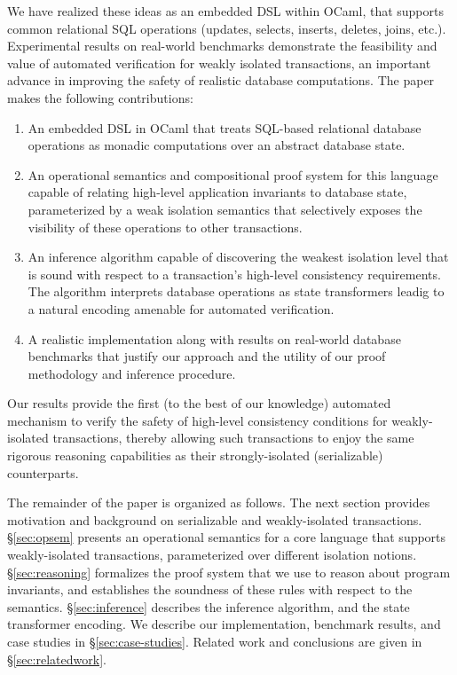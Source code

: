 We have realized these ideas as an embedded DSL within OCaml, that
supports common relational SQL operations (updates, selects, inserts,
deletes, joins, etc.).  Experimental results on real-world benchmarks
demonstrate the feasibility and value of automated verification for
weakly isolated transactions, an important advance in improving the
safety of realistic database computations. The paper makes the
following contributions:
\vspace*{-6pt}
\begin{enumerate}
\item An embedded DSL in OCaml that treats SQL-based relational
  database operations as monadic computations over an abstract
  database state.
 \item An operational semantics and compositional proof system for
   this language capable of relating high-level application invariants
   to database state, parameterized by a weak isolation semantics that
   selectively exposes the visibility of these operations to other
   transactions.
 \item An inference algorithm capable of discovering the weakest
   isolation level that is sound with respect to a transaction's
   high-level consistency requirements.  The algorithm interprets
   database operations as state transformers leadig to a
   natural encoding amenable for automated verification.
 \item A realistic implementation along with results on real-world
   database benchmarks that justify our approach and the utility of
   our proof methodology and inference procedure.
\end{enumerate}
\noindent Our results provide the first (to the best of our knowledge)
automated mechanism to verify the safety of high-level consistency
conditions for weakly-isolated transactions, thereby allowing such
transactions to enjoy the same rigorous reasoning capabilities as
their strongly-isolated (serializable) counterparts.

The remainder of the paper is organized as follows. The next section
provides motivation and background on serializable and weakly-isolated
transactions. \S\ref{sec:opsem} presents an operational semantics for
a core language that supports weakly-isolated transactions,
parameterized over different isolation notions. \S\ref{sec:reasoning}
formalizes the proof system that we use to reason about program
invariants, and establishes the soundness of these rules with respect
to the semantics. \S\ref{sec:inference} describes the inference
algorithm, and the state transformer encoding.  We describe our
implementation, benchmark results, and case studies in
\S\ref{sec:case-studies}.  Related work and conclusions are given in
\S\ref{sec:relatedwork}.
